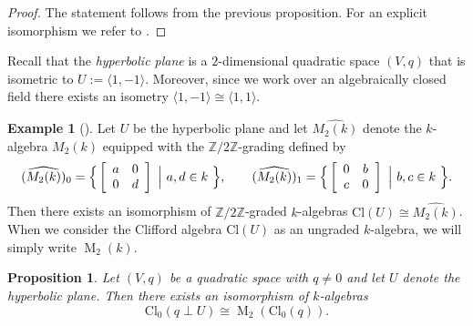 \documentclass[a4paper, twoside, 11pt]{amsart}
\newtheorem{proposition}[theorem]{Proposition}
\theoremstyle{definition}
\newtheorem{example}[theorem]{Example}
\theoremstyle{remark}
\numberwithin{equation}{theorem}
\DeclareMathOperator{\matri}{M}
\newcommand{\evencl}{\mathrm{Cl}_0}
\newcommand{\cl}{\mathrm{Cl}}
\begin{document}
\begin{proof}
    The statement follows from the previous proposition. For an explicit isomorphism we refer to \cite[Lemma 4.1]{physics}.
\end{proof}
Recall that the \textit{hyperbolic plane} is a $2$-dimensional quadratic space $(V,q)$ that is isometric to $U := \langle 1,-1\rangle$. Moreover, since we work over an algebraically closed field there exists an isometry $\langle 1,-1\rangle \cong \langle 1,1\rangle$.
\begin{example}[{\cite[Example 1.5(4)]{Lam_quadratic}}]\label{clifford_alg_hyperbolic}
    Let $U$ be the hyperbolic plane and let $\widehat{M_2(k)}$ denote the $k$-algebra $M_2(k)$ equipped with the $\mathbb{Z}/2\mathbb{Z}$-grading defined by
    \begin{equation*}
        (\widehat{M_2(k)})_0 = \Big{\{} \left[ {\begin{array}{cc}
            a & 0 \\
            0 & d \\
        \end{array} } \right] \ \Big{|} \ a,d \in k \ \Big{\}}, \quad \quad
        (\widehat{M_2(k)})_1 = \Big{\{} \left[ {\begin{array}{cc}
            0 & b \\
            c & 0 \\
        \end{array} } \right] \ \Big{|} \ b,c \in k \ \Big{\}}.
    \end{equation*}
    Then there exists an isomorphism of $\mathbb{Z}/2\mathbb{Z}$-graded $k$-algebras $\cl(U) \cong \widehat{M_2(k)}$. When we consider the Clifford algebra $\cl(U)$ as an ungraded $k$-algebra, we will simply write $\matri_2(k)$.
\end{example}
\begin{proposition}\label{morita_red}
    Let $(V,q)$ be a quadratic space with $q\neq 0$ and let $U$ denote the hyperbolic plane. Then there exists an isomorphism of $k$-algebras 
    \begin{equation*}
        \evencl(q \perp U) \cong \matri_2(\evencl(q)).
    \end{equation*}
\end{proposition}
\end{document}
